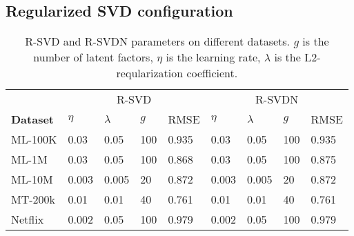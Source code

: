 \subsection{Regularized SVD configuration}
\label{sec:configurationofR-SVD}
\begin{table}[ht]
\centering
\scriptsize
\begin{tabular}{lllllllll}
  \toprule
  &\multicolumn{4}{c}{R-SVD} & \multicolumn{4}{c}{R-SVDN} \\
 \cmidrule(r){2-5} \cmidrule(r){6-9} 
  {\bf Dataset}  &  $\eta$ & $\lambda$ & $g$ & RMSE  &  $\eta$ & $\lambda$ & $g$ & RMSE  \\ \midrule
  ML-100K &0.03 & 0.05  & 100 &  0.935   & 0.03 &0.05 & 100& 0.935\\
  
  ML-1M  & 0.03 & 0.05 & 100 &  0.868   & 0.03 & 0.05 & 100 & 0.875   \\
  
  ML-10M  &0.003 & 0.005 &  20 & 0.872   & 0.003 & 0.005& 20 &0.872    \\
  
  
  MT-200k  & 0.01 &  0.01 & 40 & 0.761   &0.01 &0.01& 40 & 0.761 \\ 
  
  
  
  Netflix & 0.002 & 0.05 &  100 & 0.979  & 0.002 & 0.05 & 100 & 0.979 \\
   \bottomrule
\end{tabular}
\caption{R-SVD and R-SVDN  parameters on different datasets. $g$ is the number of latent factors, $\eta$ is the learning rate, $\lambda$ is the L2-reqularization coefficient.}
\label{tab:DatasetStatsticsFull}
\end{table}

